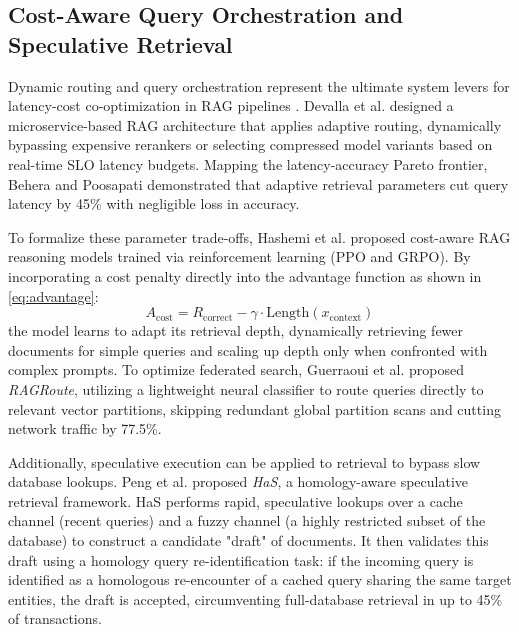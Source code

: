 \documentclass{ieeeaccess}
\begin{document}
\subsection{Cost-Aware Query Orchestration and Speculative Retrieval}
Dynamic routing and query orchestration represent the ultimate system levers for latency-cost co-optimization in RAG pipelines \cite{devalla-microservice-rag-2025, hashemi-cost-aware-2025}. Devalla et al. \cite{devalla-microservice-rag-2025} designed a microservice-based RAG architecture that applies adaptive routing, dynamically bypassing expensive rerankers or selecting compressed model variants based on real-time SLO latency budgets. Mapping the latency-accuracy Pareto frontier, Behera and Poosapati \cite{behera-optimizing-irjmets-2025} demonstrated that adaptive retrieval parameters cut query latency by 45\% with negligible loss in accuracy.

To formalize these parameter trade-offs, Hashemi et al. \cite{hashemi-cost-aware-2025} proposed cost-aware RAG reasoning models trained via reinforcement learning (PPO and GRPO). By incorporating a cost penalty directly into the advantage function as shown in \eqref{eq:advantage}:
\begin{equation}
\label{eq:advantage}
    A_{\text{cost}} = R_{\text{correct}} - \gamma \cdot \text{Length}(x_{\text{context}})
\end{equation}
the model learns to adapt its retrieval depth, dynamically retrieving fewer documents for simple queries and scaling up depth only when confronted with complex prompts. To optimize federated search, Guerraoui et al. \cite{guerraoui-federated-rag-2025} proposed \emph{RAGRoute}, utilizing a lightweight neural classifier to route queries directly to relevant vector partitions, skipping redundant global partition scans and cutting network traffic by 77.5\%.

Additionally, speculative execution can be applied to retrieval to bypass slow database lookups. Peng et al. \cite{peng-has-2025} proposed \emph{HaS}, a homology-aware speculative retrieval framework. HaS performs rapid, speculative lookups over a cache channel (recent queries) and a fuzzy channel (a highly restricted subset of the database) to construct a candidate "draft" of documents. It then validates this draft using a homology query re-identification task: if the incoming query is identified as a homologous re-encounter of a cached query sharing the same target entities, the draft is accepted, circumventing full-database retrieval in up to 45\% of transactions.
\end{document}
